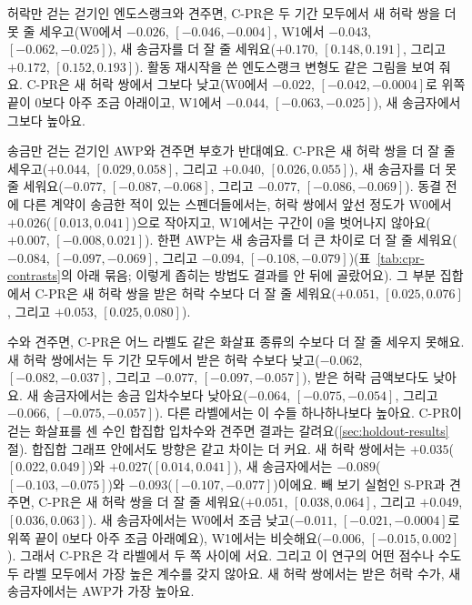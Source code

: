 허락만 걷는 걷기인 엔도스랭크와 견주면, \mbox{C-PR}은 두 기간 모두에서 새 허락 쌍을 더 못 줄 세우고(W0에서 $-0.026$, $[-0.046,-0.004]$, W1에서 $-0.043$, $[-0.062,-0.025]$), 새 송금자를 더 잘 줄 세워요($+0.170$, $[0.148,0.191]$, 그리고 $+0.172$, $[0.152,0.193]$). 활동 재시작을 쓴 엔도스랭크 변형도 같은 그림을 보여 줘요. \mbox{C-PR}은 새 허락 쌍에서 그보다 낮고(W0에서 $-0.022$, $[-0.042,-0.0004]$로 위쪽 끝이 0보다 아주 조금 아래이고, W1에서 $-0.044$, $[-0.063,-0.025]$), 새 송금자에서 그보다 높아요.

송금만 걷는 걷기인 AWP와 견주면 부호가 반대예요. \mbox{C-PR}은 새 허락 쌍을 더 잘 줄 세우고($+0.044$, $[0.029,0.058]$, 그리고 $+0.040$, $[0.026,0.055]$), 새 송금자를 더 못 줄 세워요($-0.077$, $[-0.087,-0.068]$, 그리고 $-0.077$, $[-0.086,-0.069]$). 동결 전에 다른 계약이 송금한 적이 있는 스펜더들에서는, 허락 쌍에서 앞선 정도가 W0에서 $+0.026$($[0.013,0.041]$)으로 작아지고, W1에서는 구간이 0을 벗어나지 않아요($+0.007$, $[-0.008,0.021]$). 한편 AWP는 새 송금자를 더 큰 차이로 더 잘 줄 세워요($-0.084$, $[-0.097,-0.069]$, 그리고 $-0.094$, $[-0.108,-0.079]$)(표~\ref{tab:cpr-contrasts}의 아래 묶음; 이렇게 좁히는 방법도 결과를 안 뒤에 골랐어요). 그 부분 집합에서 \mbox{C-PR}은 새 허락 쌍을 받은 허락 수보다 더 잘 줄 세워요($+0.051$, $[0.025,0.076]$, 그리고 $+0.053$, $[0.025,0.080]$).

수와 견주면, \mbox{C-PR}은 어느 라벨도 같은 화살표 종류의 수보다 더 잘 줄 세우지 못해요. 새 허락 쌍에서는 두 기간 모두에서 받은 허락 수보다 낮고($-0.062$, $[-0.082,-0.037]$, 그리고 $-0.077$, $[-0.097,-0.057]$), 받은 허락 금액보다도 낮아요. 새 송금자에서는 송금 입차수보다 낮아요($-0.064$, $[-0.075,-0.054]$, 그리고 $-0.066$, $[-0.075,-0.057]$). 다른 라벨에서는 이 수들 하나하나보다 높아요. \mbox{C-PR}이 걷는 화살표를 센 수인 합집합 입차수와 견주면 결과는 갈려요(\ref{sec:holdout-results}절). 합집합 그래프 안에서도 방향은 같고 차이는 더 커요. 새 허락 쌍에서는 $+0.035$($[0.022,0.049]$)와 $+0.027$($[0.014,0.041]$), 새 송금자에서는 $-0.089$($[-0.103,-0.075]$)와 $-0.093$($[-0.107,-0.077]$)이에요. 빼 보기 실험인 \mbox{S-PR}과 견주면, \mbox{C-PR}은 새 허락 쌍을 더 잘 줄 세워요($+0.051$, $[0.038,0.064]$, 그리고 $+0.049$, $[0.036,0.063]$). 새 송금자에서는 W0에서 조금 낮고($-0.011$, $[-0.021,-0.0004]$로 위쪽 끝이 0보다 아주 조금 아래예요), W1에서는 비슷해요($-0.006$, $[-0.015,0.002]$). 그래서 \mbox{C-PR}은 각 라벨에서 두 쪽 사이에 서요. 그리고 이 연구의 어떤 점수나 수도 두 라벨 모두에서 가장 높은 계수를 갖지 않아요. 새 허락 쌍에서는 받은 허락 수가, 새 송금자에서는 AWP가 가장 높아요.


